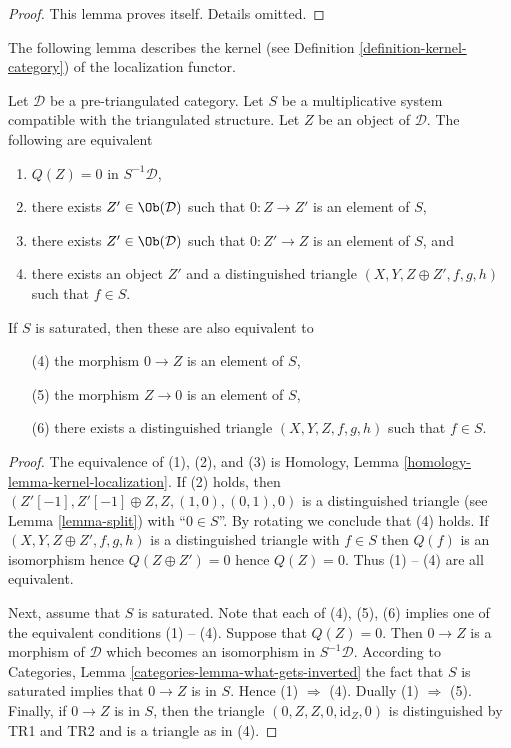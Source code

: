 \begin{proof}
This lemma proves itself. Details omitted.
\end{proof}

\noindent
The following lemma describes the kernel (see
Definition \ref{definition-kernel-category})
of the localization functor.

\begin{lemma}
\label{lemma-kernel-localization}
Let $\mathcal{D}$ be a pre-triangulated category. Let $S$ be a multiplicative
system compatible with the triangulated structure. Let $Z$ be an object
of $\mathcal{D}$. The following are equivalent
\begin{enumerate}
\item $Q(Z) = 0$ in $S^{-1}\mathcal{D}$,
\item there exists $Z' \in \Ob(\mathcal{D})$ such that
$0 : Z \to Z'$ is an element of $S$,
\item there exists $Z' \in \Ob(\mathcal{D})$ such that
$0 : Z' \to Z$ is an element of $S$, and
\item there exists an object $Z'$ and a distinguished triangle
$(X, Y, Z \oplus Z', f, g, h)$ such that $f \in S$.
\end{enumerate}
If $S$ is saturated, then these are also equivalent to
\begin{enumerate}
\item[(4)] the morphism $0 \to Z$ is an element of $S$,
\item[(5)] the morphism $Z \to 0$ is an element of $S$,
\item[(6)] there exists a distinguished triangle $(X, Y, Z, f, g, h)$
such that $f \in S$.
\end{enumerate}
\end{lemma}

\begin{proof}
The equivalence of (1), (2), and (3) is
Homology, Lemma \ref{homology-lemma-kernel-localization}.
If (2) holds, then $(Z'[-1], Z'[-1] \oplus Z, Z, (1, 0), (0, 1), 0)$
is a distinguished triangle (see
Lemma \ref{lemma-split})
with ``$0 \in S$''. By rotating we conclude that (4) holds.
If $(X, Y, Z \oplus Z', f, g, h)$ is a distinguished triangle with $f \in S$
then $Q(f)$ is an isomorphism hence $Q(Z \oplus Z') = 0$ hence $Q(Z) = 0$.
Thus (1) -- (4) are all equivalent.

\medskip\noindent
Next, assume that $S$ is saturated. Note that each of (4), (5), (6)
implies one of the equivalent conditions (1) -- (4). Suppose that
$Q(Z) = 0$. Then $0 \to Z$ is a morphism of $\mathcal{D}$ which becomes
an isomorphism in $S^{-1}\mathcal{D}$. According to
Categories, Lemma \ref{categories-lemma-what-gets-inverted}
the fact that $S$ is saturated implies that $0 \to Z$ is in $S$.
Hence (1) $\Rightarrow$ (4). Dually (1) $\Rightarrow$ (5).
Finally, if $0 \to Z$ is in $S$, then the triangle
$(0, Z, Z, 0, \text{id}_Z, 0)$ is distinguished by TR1 and TR2 and
is a triangle as in (4).
\end{proof}

